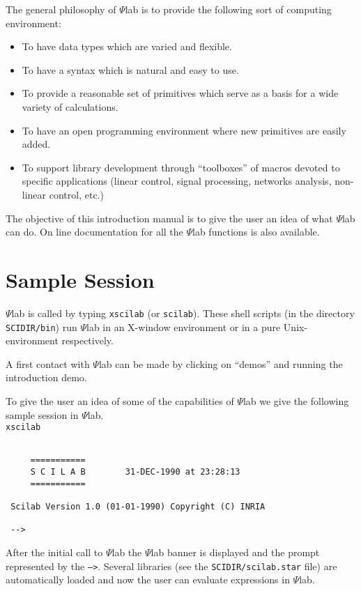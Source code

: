 	The general philosophy of $\Psi$lab is to provide the following
sort of computing environment:
\begin{itemize}
   \item To have data types which are varied and flexible.
   \item To have a syntax which is natural and easy to use.
   \item To provide a reasonable set of primitives which serve
	   as a basis for a wide variety of calculations.
   \item To have an open programming environment where new
	   primitives are easily added.
   \item To support library development through ``toolboxes'' of
         macros devoted to specific
	   applications (linear control, signal processing, 
	   networks analysis, non-linear control, etc.)
\end{itemize}

	The objective of this introduction manual is to give the user 
an idea of what $\Psi$lab can do. On line documentation for all the
$\Psi$lab functions is also available.

\section{Sample Session}

$\Psi$lab is called by typing {\tt xscilab} (or {\tt scilab}).
These shell scripts  (in the directory {\tt SCIDIR/bin}) run $\Psi$lab 
in an X-window environment or in a pure Unix-environment respectively.

A first contact with $\Psi$lab can be made by clicking on ``demos''
and running the introduction demo.

	To give the user an idea of some of the capabilities of $\Psi$lab
we give the following sample session in $\Psi$lab.\\
\bigskip
{\tt xscilab}
\begin{verbatim}

     ===========
     S C I L A B        31-DEC-1990 at 23:28:13 
     ===========

 Scilab Version 1.0 (01-01-1990) Copyright (C) INRIA
   
 -->

\end{verbatim}
After the initial call to $\Psi$lab the $\Psi$lab banner is displayed
and the prompt represented by the {\tt -->}.  Several libraries
(see the {\tt SCIDIR/scilab.star} file) are automatically loaded and 
now the user can evaluate expressions in $\Psi$lab.

